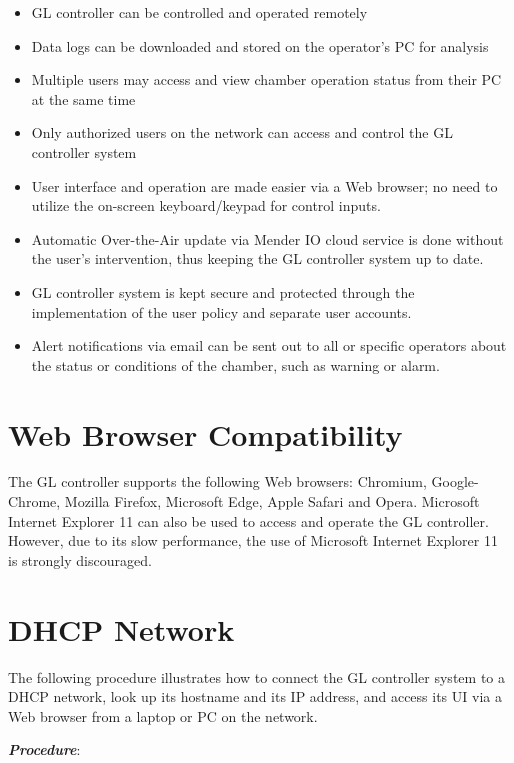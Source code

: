 \begin{itemize}
\item
  GL controller can be controlled and operated remotely
\item
  Data logs can be downloaded and stored on the operator's PC for
  analysis
\item
  Multiple users may access and view chamber operation status from their
  PC at the same time
\item
  Only authorized users on the network can access and control the GL
  controller system
\item
  User interface and operation are made easier via a Web browser; no
  need to utilize the on-screen keyboard/keypad for control inputs.
\item
  Automatic Over-the-Air update via Mender IO cloud service is done
  without the user's intervention, thus keeping the GL controller system
  up to date.
\item
  GL controller system is kept secure and protected through the
  implementation of the user policy and separate user accounts.
\item
  Alert notifications via email can be sent out to all or specific
  operators about the status or conditions of the chamber, such as
  warning or alarm.
\end{itemize}


\section{Web Browser
Compatibility}

The GL controller supports the following Web browsers: Chromium,
Google-Chrome, Mozilla Firefox, Microsoft Edge, Apple Safari and Opera.
Microsoft Internet Explorer 11 can also be used to access and operate
the GL controller. However, due to its slow performance, the use of
Microsoft Internet Explorer 11 is strongly discouraged.


\section{DHCP Network}

The following procedure illustrates how to connect the GL controller
system to a DHCP network, look up its hostname and its IP address, and
access its UI via a Web browser from a laptop or PC on the network.

\textbf{\emph{Procedure}}:

